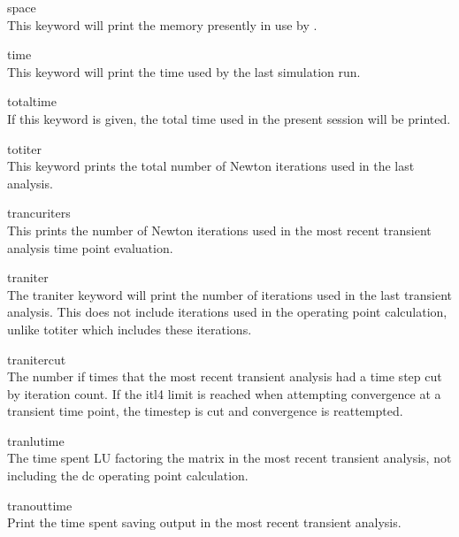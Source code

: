 \begin{description}
\item{\vt space}\\
This keyword will print the memory presently in use by {\WRspice}.

\item{\vt time}\\
This keyword will print the time used by the last simulation run.

\item{\vt totaltime}\\
If this keyword is given, the total time used in the present session
will be printed.

\item{\vt totiter}\\
This keyword prints the total number of Newton iterations used in
the last analysis.

\item{\vt trancuriters}\\
This prints the number of Newton iterations used in the most recent
transient analysis time point evaluation.

\item{\vt traniter}\\
The {\vt traniter} keyword will print the number of iterations used in
the last transient analysis.  This does not include iterations used in
the operating point calculation, unlike {\vt totiter} which includes
these iterations.

\item{\vt tranitercut}\\
The number if times that the most recent transient analysis had a time
step cut by iteration count.  If the {\et itl4} limit is reached when
attempting convergence at a transient time point, the timestep is cut
and convergence is reattempted.

\item{\vt tranlutime}\\
The time spent LU factoring the matrix in the most recent transient
analysis, not including the dc operating point calculation.

\item{\vt tranouttime}\\
Print the time spent saving output in the most recent transient
analysis.


\end{description}
